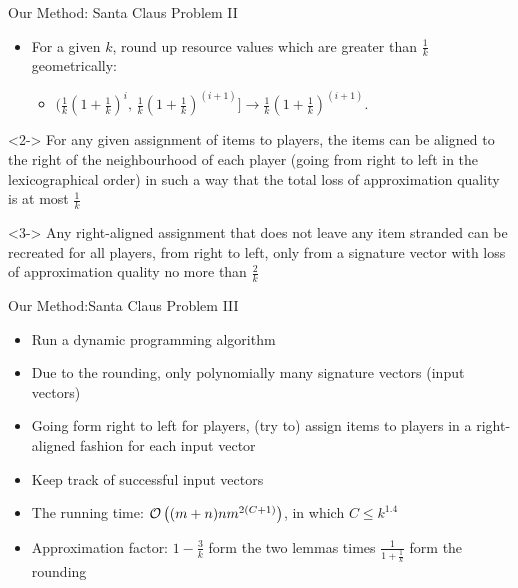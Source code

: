 \documentclass[10pt]{beamer}
\begin{document}
\begin{frame}{Our Method: Santa Claus Problem II}
	\begin{itemize}
    	\item<1-> For a given $k$, round \alert{up} resource values which are greater than $\frac{1}{k}$ geometrically:
    	\begin{itemize}
    	    \item<2-> $\Big( \frac{1}{k}(1 + \frac{1}{k})^i, \, \frac{1}{k}(1 + \frac{1}{k})^{(i + 1)} \Big]  \rightarrow \frac{1}{k}(1 + \frac{1}{k})^{(i + 1)}$.
    	\end{itemize}
	\end{itemize}
	\begin{lemma}<2->
    	For any given assignment of items to players, the items can be \alert{aligned} to the right of the neighbourhood of each player (going from right to left in the lexicographical order) in such a way that the total loss of approximation quality is at most $\frac{1}{k}$
    \end{lemma}
    \begin{lemma}<3->
    	Any right-aligned assignment that does not leave any item \alert{stranded} can be recreated for all players, from right to left, only from a \alert{signature vector} with loss of approximation quality no more than $\frac{2}{k}$
    \end{lemma}
\end{frame}

\begin{frame}{Our Method:Santa Claus Problem III}
	\begin{itemize}
    	\item<1-> Run a dynamic programming algorithm
        \item<2-> Due to the rounding, only polynomially many signature vectors (\alert{input vectors)}
        \item<3-> Going form right to left for players, (try to) assign items to players in a right-aligned fashion for each input vector
        \item<4-> Keep track of \alert{successful} input vectors
        \item<5-> The running time: $\mathcal{O} \left( (m + n)nm^{2(C+1)} \right)$, in which $C \leq k^{1.4}$
        \item<6-> Approximation factor: $1 - \frac{3}{k}$ form the \alert{two lemmas} times $\frac{1}{1 + \frac{1}{k}}$ form the \alert{rounding}
	\end{itemize}
\end{frame}
\end{document}
